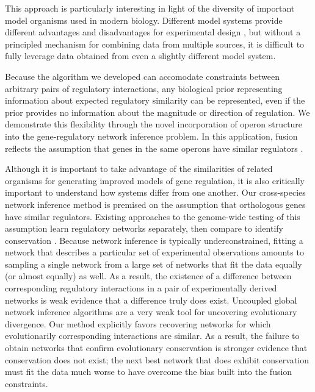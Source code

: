 \documentclass[11pt]{article}
\begin{document}
This approach is particularly interesting in light of the diversity of important model organisms used in modern biology. Different model systems provide different advantages and disadvantages for experimental design \cite{stolfi_genetic_2012}, but without a principled mechanism for combining data from multiple sources, it is difficult to fully leverage data obtained from even a slightly different model system. 

Because the algorithm we developed can accomodate constraints between arbitrary pairs of regulatory interactions, any biological prior representing information about expected regulatory similarity can be represented, even if the prior provides no information about the magnitude or direction of regulation. 
We demonstrate this flexibility through the novel incorporation of operon structure into the gene-regulatory network inference problem. 
In this application, fusion reflects the assumption that genes in the same operons have similar regulators \cite{lawrence_shared_2002}. 


Although it is important to take advantage of the similarities of related organisms for generating improved models of gene regulation, it is also critically important to understand how systems differ from one another. 
Our cross-species network inference method is premised on the assumption that orthologous genes have similar regulators. Existing approaches to the genome-wide testing of this assumption learn regulatory networks separately, then compare to identify conservation \cite{aytes_cross-species_2014}. 
Because network inference is typically underconstrained, fitting a network that describes a particular set of experimental observations amounts to sampling a single network from a large set of networks that fit the data equally (or almost equally) as well. As a result, the existence of a difference between corresponding regulatory interactions in a pair of experimentally derived networks is weak evidence that a difference truly does exist. 
Uncoupled global network inference algorithms are a very weak tool for uncovering evolutionary divergence. 
Our method explicitly favors recovering networks for which evolutionarily corresponding interactions are similar. 
As a result, the failure to obtain networks that confirm evolutionary conservation is stronger evidence that conservation does not exist; the next best network that does exhibit conservation must fit the data much worse to have overcome the bias built into the fusion constraints. 
\end{document}
